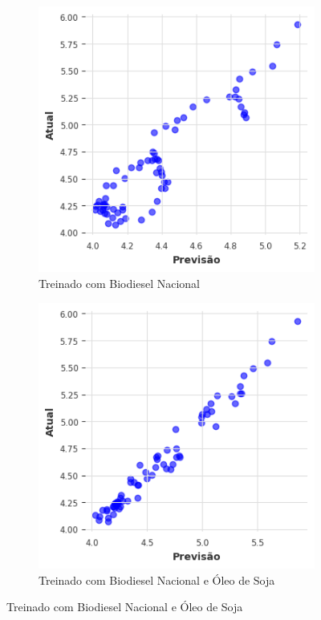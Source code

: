 \begin{figure}[htbp]
	\centering
	\begin{subfigure}[b]{0.40\textwidth}
		\centering
		\includegraphics[width=\textwidth]{figuras/nhits_takens_brasil_scatter.png} %
		\caption{Treinado com Biodiesel Nacional \newline}
		\label{fig:nhits_takens_brasil_scatter}
	\end{subfigure}
	\hfill
	\begin{subfigure}[b]{0.40\textwidth}
		\centering
		\includegraphics[width=\textwidth]{figuras/nhits_takens_brasil_oil_scatter.png} %
		\caption{Treinado com Biodiesel Nacional e Óleo de Soja}
		\label{fig:nhits_takens_brasil_oil_scatter}
	\end{subfigure}


\end{figure}
